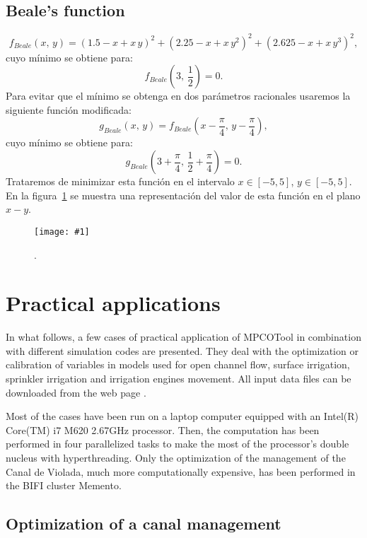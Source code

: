\documentclass[review,authoryear]{elsarticle}
\newcommand{\EQ}[2]
{\begin{equation}#1\label{#2}\end{equation}}
\newcommand{\PLOT}[3]
{
	\begin{figure}[ht!]
		\centering
		\texttt{[image: \#1]}
		\caption{#2.\label{#3}}
	\end{figure}
}
\newcommand{\PA}[1]{\left(#1\right)}
\begin{document}
\subsection{Beale's function} 

\EQ{f_{Beale}(x,\,y)=(1.5-x+x\,y)^2+\PA{2.25-x+x\,y^2}^2+\PA{2.625-x+x\,y^3}^2,}
{EqFBeale}
cuyo mínimo se obtiene para:
\EQ{f_{Beale}\PA{3,\,\frac12}=0.}{EqFBealeM}
Para evitar que el mínimo se obtenga en dos parámetros racionales usaremos la
siguiente función modificada:
\EQ{g_{Beale}(x,\,y)=f_{Beale}\PA{x-\frac{\pi}{4},\,y-\frac{\pi}{4}},}
{EqGBeale}
cuyo mínimo se obtiene para:
\EQ{g_{Beale}\PA{3+\frac{\pi}{4},\,\frac12+\frac{\pi}{4}}=0.}{EqGBealeM}
Trataremos de minimizar esta función en el intervalo $x\in[-5,5]$, $y\in[-5,5]$.
En la figura~\ref{FigBeale} se muestra una representación del valor de esta
función en el plano $x-y$.
\PLOT{Beale.eps}{}{FigBeale}

\section{Practical applications}

In what follows, a few cases of practical application of MPCOTool in combination with
different simulation codes are presented. They deal with the optimization
or calibration 
of variables in models used for open channel flow, surface irrigation, sprinkler irrigation and irrigation
engines movement. All input data files can be downloaded from the web page \citep{MPCOToolGit}.

Most of the cases have been run on a laptop computer equipped with an Intel(R) Core(TM) i7 M620 2.67GHz processor. 
Then, the computation has been performed in four parallelized tasks to make the most of the processor's double nucleus with hyperthreading.
Only the optimization of the management of the Canal de Violada, much more computationally expensive, has been performed in the BIFI cluster Memento.

\subsection{Optimization of a canal management}
\end{document}
